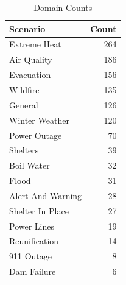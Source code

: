 \begin{table}
\label{tab:domain_counts}
\begin{tabular}{|l|r|}
\toprule
\rowcolor{lightgray}
Scenario & Count \\
\midrule
Extreme Heat & 264 \\
Air Quality & 186 \\
Evacuation & 156 \\
Wildfire & 135 \\
General & 126 \\
Winter Weather & 120 \\
Power Outage & 70 \\
Shelters & 39 \\
Boil Water & 32 \\
Flood & 31 \\
Alert And Warning & 28 \\
Shelter In Place & 27 \\
Power Lines & 19 \\
Reunification & 14 \\
911 Outage & 8 \\
Dam Failure & 6 \\
\bottomrule
\end{tabular}
\caption{Domain Counts}
\label{tab:domain_counts}

\end{table}